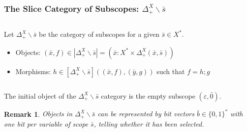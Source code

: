 \documentclass[aspectratio=169]{beamer}
\theoremstyle{remarkstyle}
\newtheorem*{remark}{Remark}
\begin{document}
\begin{frame}[fragile]
  \frametitle{The Slice Category of Subscopes: $Δ_+^X∖\bar{s}$}
  \begin{definition}
    \begin{columns}
      \begin{column}{0.68\textwidth}
        Let $Δ_+^X∖\bar{s}$ be the category of subscopes for a given $\bar{s} ∈ X^*$. 
        \begin{itemize}
          \item Objects: $(\bar{x}, f) ∈ |Δ_+^X∖\bar{s}| = \left(\bar{x} : X^* × Δ_+^X(\bar{x}, \bar{s}) \right)$
          \item Morphisms: $h ∈ [Δ_+^X∖\bar{s}]((\bar{x}, f), (\bar{y}, g))$ such that $f = h;g$ 
        \end{itemize}
      \end{column}
      \begin{column}{0.3\textwidth}
      \end{column}
    \end{columns}
    
  \end{definition}
  \begin{corollary}
    The initial object of the $Δ_+^X∖\bar{s}$ category is the empty subscope $(ε, \bar{0})$. 
  \end{corollary}
  \begin{remark}
    Objects in $Δ_+^X∖\bar{s}$ can be represented by \emph{bit vectors} $\bar{b} ∈ \{0, 1\}^*$ with one bit per variable of scope $\bar{s}$, telling whether it has been selected.
  \end{remark}
\end{frame}
\end{document}
